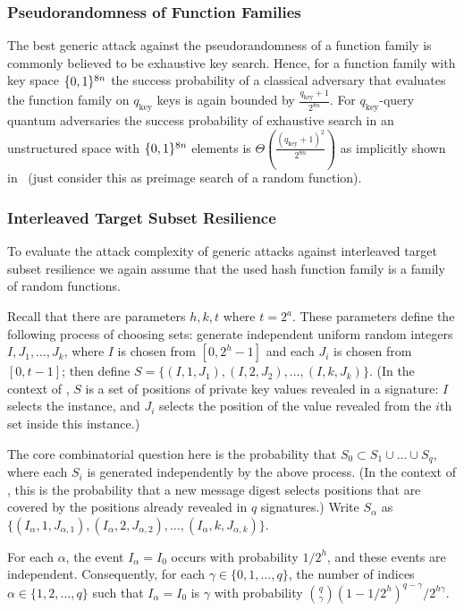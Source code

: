 \subsubsection{Pseudorandomness of Function Families}
The best generic attack against the pseudorandomness of a function
family is commonly believed to be exhaustive key search. Hence, for a
function family with key space $\{0,1\}^{8n}$ the success probability of
a classical adversary that evaluates the function family on $q_{\text{key}}$ keys
is again bounded by $\frac{q_{\text{key}}+1}{2^{8n}}$. For $q_{\text{key}}$-query quantum adversaries the
success probability of exhaustive search in an unstructured space with
$\{0,1\}^{8n}$ elements is $\Theta(\frac{(q_{\text{key}}+1)^2}{2^{8n}})$ as implicitly shown
in~\cite{Huelsing2016} (just consider this as preimage search of a random
function).

\subsubsection{Interleaved Target Subset Resilience}
To evaluate the attack complexity of generic attacks against interleaved target
subset resilience we again assume that the used hash function family is a
family of random functions.

Recall that there are parameters $h,k,t$ where $t=2^a$.
These parameters define the following process of choosing sets:
generate independent uniform random integers $I,J_1,\dots,J_k$,
where $I$ is chosen from $[0,2^h-1]$
and each $J_i$ is chosen from $[0,t-1]$;
then define $S=\{(I,1,J_1),(I,2,J_2),\dots,(I,k,J_k)\}$.
(In the context of \spx,
$S$ is a set of positions of \fors private key values revealed in a signature:
$I$ selects the \fors instance,
and $J_i$ selects the position of the value revealed
from the $i$th set inside this \fors instance.)

The core combinatorial question here
is the probability that $S_0\subset S_1\cup\dots\cup S_q$,
where each $S_i$ is generated independently by the above process.
(In the context of \spx,
this is the probability that a new message digest
selects \fors positions that are covered
by the positions already revealed in $q$ signatures.)
Write $S_\alpha$
as $\{(I_\alpha,1,J_{\alpha,1}),(I_\alpha,2,J_{\alpha,2}),\dots,(I_\alpha,k,J_{\alpha,k})\}$.

For each $\alpha$,
the event $I_\alpha=I_0$ occurs with probability $1/2^h$,
and these events are independent.
Consequently,
for each $\gamma\in\{0,1,\dots,q\}$,
the number of indices $\alpha\in\{1,2,\dots,q\}$
such that $I_\alpha=I_0$
is $\gamma$ with probability ${q\choose \gamma} (1-1/2^h)^{q-\gamma}/2^{h\gamma}$.

